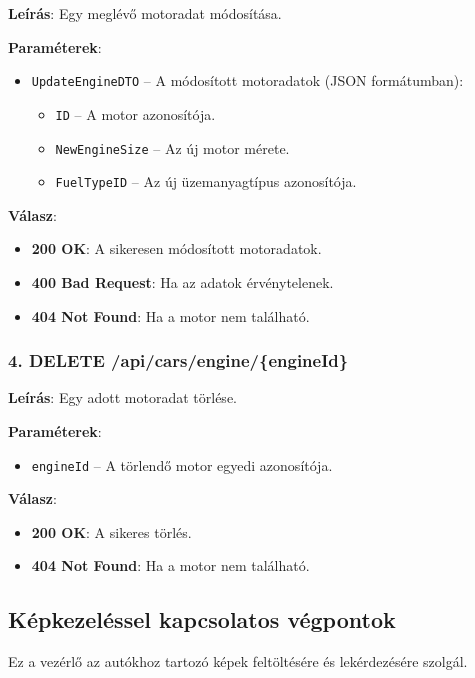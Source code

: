 \documentclass{report}[11pt]
\begin{document}
\textbf{Leírás}:  
Egy meglévő motoradat módosítása.

\textbf{Paraméterek}:  
\begin{itemize}
    \item \texttt{UpdateEngineDTO} – A módosított motoradatok (JSON formátumban):
    \begin{itemize}
        \item \texttt{ID} – A motor azonosítója.
        \item \texttt{NewEngineSize} – Az új motor mérete.
        \item \texttt{FuelTypeID} – Az új üzemanyagtípus azonosítója.
    \end{itemize}
\end{itemize}

\textbf{Válasz}:  
\begin{itemize}
    \item \textbf{200 OK}: A sikeresen módosított motoradatok.
    \item \textbf{400 Bad Request}: Ha az adatok érvénytelenek.
    \item \textbf{404 Not Found}: Ha a motor nem található.
\end{itemize}

\subsubsection{4. DELETE /api/cars/engine/\{engineId\}}

\textbf{Leírás}:  
Egy adott motoradat törlése.

\textbf{Paraméterek}:  
\begin{itemize}
    \item \texttt{engineId} – A törlendő motor egyedi azonosítója.
\end{itemize}

\textbf{Válasz}:  
\begin{itemize}
    \item \textbf{200 OK}: A sikeres törlés.
    \item \textbf{404 Not Found}: Ha a motor nem található.
\end{itemize}

\subsection{Képkezeléssel kapcsolatos végpontok}

Ez a vezérlő az autókhoz tartozó képek feltöltésére és lekérdezésére szolgál.
\end{document}
